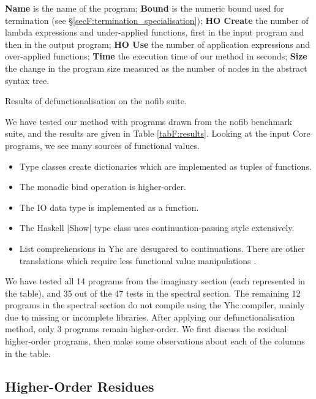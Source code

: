 \begin{table}
\bigskip
\textbf{Name} is the name of the program;
\textbf{Bound} is the numeric bound used for termination (see \S\ref{secF:termination_specialisation});
\textbf{HO Create} the number of lambda expressions and under-applied functions, first in the input program and then in the output program;
\textbf{HO Use} the number of application expressions and over-applied functions;
\textbf{Time} the execution time of our method in seconds;
\textbf{Size} the change in the program size measured as the number of nodes in the abstract syntax tree.
\bigskip

\caption{Results of defunctionalisation on the nofib suite.}
\label{tabF:results}
\end{table}

We have tested our method with programs drawn from the nofib benchmark suite, and the results are given in Table \ref{tabF:results}. Looking at the input Core programs, we see many sources of functional values.

\begin{itemize}
\item Type classes create dictionaries which are implemented as tuples of functions.
\item The monadic bind operation is higher-order.
\item The IO data type is implemented as a function.
\item The Haskell |Show| type class uses continuation-passing style extensively.
\item List comprehensions in Yhc are desugared to continuations. There are other translations which require less functional value manipulations \cite{wadler:list_comprehensions,coutts:stream_fusion}.
\end{itemize}

We have tested all 14 programs from the imaginary section (each represented in the table), and 35 out of the 47 tests in the spectral section. The remaining 12 programs in the spectral section do not compile using the Yhc compiler, mainly due to missing or incomplete libraries. After applying our defunctionalisation method, only 3 programs remain higher-order. We first discuss the residual higher-order programs, then make some observations about each of the columns in the table.

\subsection{Higher-Order Residues}

